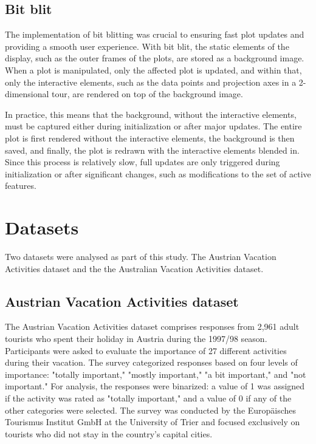 \documentclass[article]{ajs}
\begin{document}
\subsection{Bit blit}

The implementation of bit blitting was crucial to ensuring fast plot updates and providing a smooth user experience. With bit blit, the static elements of the display, such as the outer frames of the plots, are stored as a background image. When a plot is manipulated, only the affected plot is updated, and within that, only the interactive elements, such as the data points and projection axes in a 2-dimensional tour, are rendered on top of the background image.

In practice, this means that the background, without the interactive elements, must be captured either during initialization or after major updates. The entire plot is first rendered without the interactive elements, the background is then saved, and finally, the plot is redrawn with the interactive elements blended in. Since this process is relatively slow, full updates are only triggered during initialization or after significant changes, such as modifications to the set of active features.


\section{Datasets}

Two datasets were analysed as part of this study. The Austrian Vacation Activities \cite{dolnicar2003winter} dataset and the the Australian Vacation Activities \cite{cliff2009formative} dataset.

\subsection{Austrian Vacation Activities dataset}

The Austrian Vacation Activities dataset comprises responses from 2,961 adult tourists who spent their holiday in Austria during the 1997/98 season. Participants were asked to evaluate the importance of 27 different activities during their vacation. The survey categorized responses based on four levels of importance: "totally important," "mostly important," "a bit important," and "not important." For analysis, the responses were binarized: a value of 1 was assigned if the activity was rated as "totally important," and a value of 0 if any of the other categories were selected. The survey was conducted by the Europäisches Tourismus Institut GmbH at the University of Trier and focused exclusively on tourists who did not stay in the country's capital cities.
\end{document}
